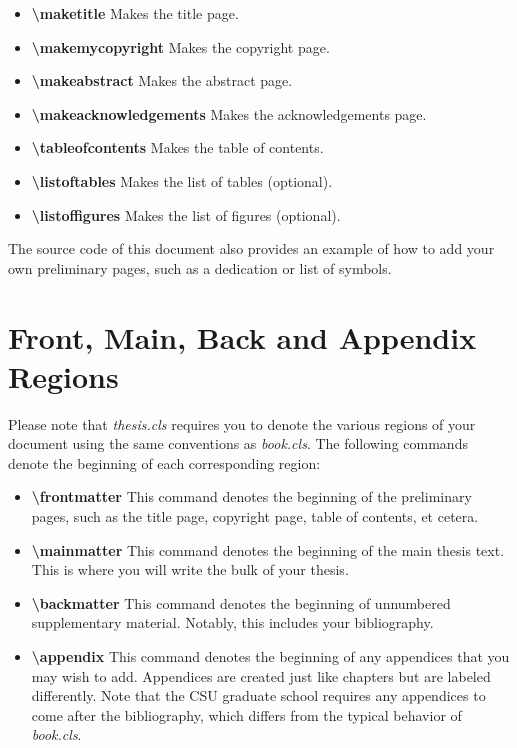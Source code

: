 \documentclass[master]{thesis}
\begin{document}
\begin{itemize}
    \item \textbf{\textbackslash maketitle}  Makes the title page.
    \item \textbf{\textbackslash makemycopyright}  Makes the copyright page.
    \item \textbf{\textbackslash makeabstract}  Makes the abstract page.
    \item \textbf{\textbackslash makeacknowledgements}  Makes the acknowledgements page.
    \item \textbf{\textbackslash tableofcontents}  Makes the table of contents.
    \item \textbf{\textbackslash listoftables}  Makes the list of tables (optional).
    \item \textbf{\textbackslash listoffigures}  Makes the list of figures (optional).
\end{itemize}

The source code of this document also provides an example of how to add your own preliminary pages, such as a dedication or list of symbols.

\section{Front, Main, Back and Appendix Regions}

Please note that \textit{thesis.cls} requires you to denote the various regions of your document using the same conventions as \textit{book.cls}.  The following commands denote the beginning of each corresponding region:

\begin{itemize}
    \item \textbf{\textbackslash frontmatter}  This command denotes the beginning of the preliminary pages, such as the title page, copyright page, table of contents, et cetera.
    \item \textbf{\textbackslash mainmatter}  This command denotes the beginning of the main thesis text.  This is where you will write the bulk of your thesis.
    \item \textbf{\textbackslash backmatter}  This command denotes the beginning of unnumbered supplementary material.  Notably, this includes your bibliography.
    \item \textbf{\textbackslash appendix}  This command denotes the beginning of any appendices that you may wish to add.  Appendices are created just like chapters but are labeled differently.  Note that the CSU graduate school requires any appendices to come after the bibliography, which differs from the typical behavior of \textit{book.cls}.
\end{itemize}
\end{document}
